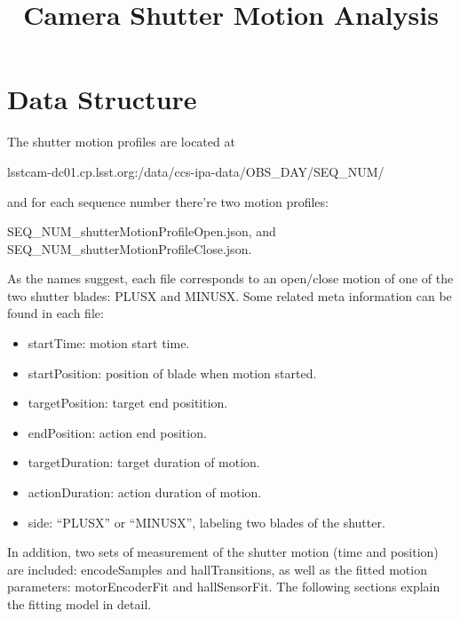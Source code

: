 \documentclass[CTN,lsstdraft,authoryear,toc]{lsstdoc}
\title{Camera Shutter Motion Analysis}
\date{\vcsDate}
\begin{document}
\maketitle

\section{Data Structure}
The shutter motion profiles are located at
\begin{displayquote}
lsstcam-dc01.cp.lsst.org:/data/ccs-ipa-data/OBS\_DAY/SEQ\_NUM/
\end{displayquote}
and for each sequence number there're two motion profiles:
\begin{displayquote}
SEQ\_NUM\_shutterMotionProfileOpen.json, and  \\ SEQ\_NUM\_shutterMotionProfileClose.json.
\end{displayquote}
As the names suggest, each file corresponds to an open/close motion of one of the two shutter blades: PLUSX and MINUSX.
Some related meta information can be found in each file:
\begin{itemize}
    \item[] startTime: motion start time.
    \item[] startPosition: position of blade when motion started.
    \item[] targetPosition: target end positition.
    \item[] endPosition: action end position.
    \item[] targetDuration: target duration of motion.
    \item[] actionDuration: action duration of motion.
    \item[] side: ``PLUSX'' or ``MINUSX'', labeling two blades of the shutter.
\end{itemize}
In addition, two sets of measurement of the shutter motion (time and position) are included: encodeSamples and hallTransitions, as well as the fitted motion parameters: motorEncoderFit and hallSensorFit.  The following sections explain the fitting model in detail.
\end{document}
